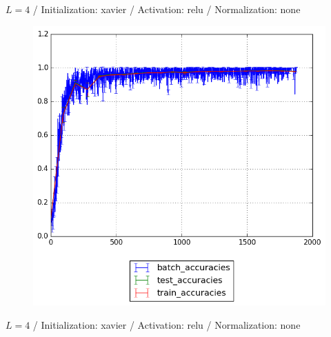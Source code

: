\documentclass{beamer}
\begin{document}
{	%
	\begin{frame}[t]{}{}%
		\vfill
		\begin{center}
			{$L = 4$ / Initialization: xavier / Activation: relu / Normalization: none}
		\end{center}
    		\begin{figure}
    			\centering
    			\includegraphics[scale=0.4]{gfx/l4b32_relu_xavier_identity_cnn_accuracies}
    		\end{figure}
    		\vfill
	\end{frame}
	\begin{frame}[t]{}{}%
		\vfill
		\begin{center}
			{$L = 4$ / Initialization: xavier / Activation: relu / Normalization: none}
		\end{center}
    		\begin{figure}
    			\centering

\end{figure}
\end{frame}}
\end{document}
